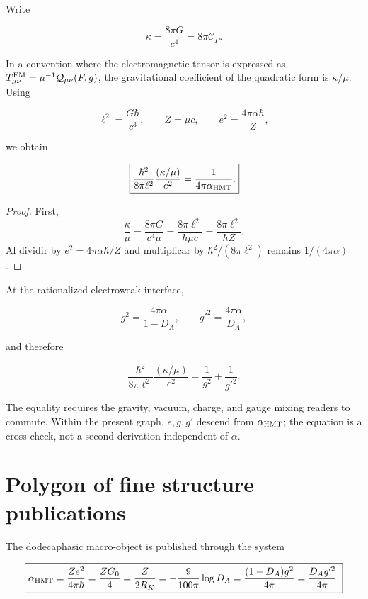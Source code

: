 Write

\[
\kappa=\frac{8\pi G}{c^4}=8\pi\mathscr C_P.
\]

In a convention where the electromagnetic tensor is expressed as
\(T_{\mu\nu}^{\rm EM}=\mu^{-1}\mathcal Q_{\mu\nu}(F,g)\), the gravitational coefficient
of the quadratic form is \(\kappa/\mu\). Using

\[
\ell^2=\frac{G\hbar}{c^3},
\qquad
Z=\mu c,
\qquad
e^2=\frac{4\pi\alpha\hbar}{Z},
\]

we obtain

\begin{equation}
\boxed{
\frac{\hbar^2}{8\pi\ell^2}
\frac{(\kappa/\mu)}{e^2}
=\frac{1}{4\pi\alpha_{\rm HMT}}.}
\label{eq:rm-einstein-maxwell-alpha}
\end{equation}

\begin{proof}
First,
\[
\frac{\kappa}{\mu}
=\frac{8\pi G}{c^4\mu}
=\frac{8\pi\ell^2}{\hbar\mu c}
=\frac{8\pi\ell^2}{\hbar Z}.
\]
Al dividir by \(e^2=4\pi\alpha\hbar/Z\) and multiplicar by
\(\hbar^2/(8\pi\ell^2)\) remains \(1/(4\pi\alpha)\).
\end{proof}

At the rationalized electroweak interface,

\[
g^2=\frac{4\pi\alpha}{1-D_A},
\qquad
g'^2=\frac{4\pi\alpha}{D_A},
\]

and therefore

\begin{equation}
\boxed{
\frac{\hbar^2}{8\pi\ell^2}
\frac{(\kappa/\mu)}{e^2}
=\frac1{g^2}+\frac1{g'^2}.}
\label{eq:rm-cross-einstein-ew}
\end{equation}

The equality requires the gravity, vacuum, charge, and gauge
mixing readers to commute. Within the present graph, \(e,g,g'\) descend
from \(\alpha_{\rm HMT}\); the equation is a cross-check, not a second
derivation independent of \(\alpha\).

\section{Polygon of fine structure publications}

The dodecaphasic macro-object is published through the system

\begin{equation}
\boxed{
\alpha_{\rm HMT}
=\frac{Ze^2}{4\pi\hbar}
=\frac{ZG_0}{4}
=\frac{Z}{2R_K}
=-\frac{9}{100\pi}\log D_A
=\frac{(1-D_A)g^2}{4\pi}
=\frac{D_Ag'^2}{4\pi}.}
\label{eq:rm-alpha-polygon}
\end{equation}

